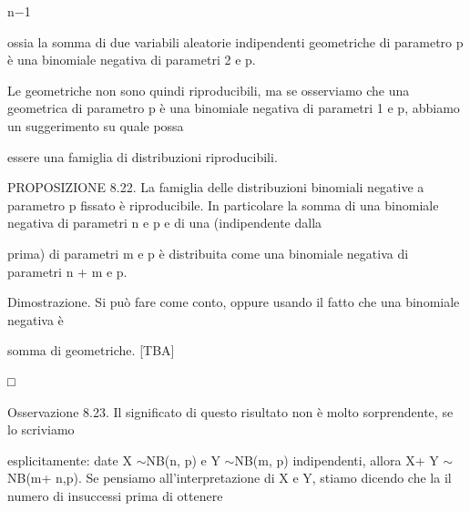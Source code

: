 \documentclass[a4paper,portrait,12pt]{article}
\begin{document}
\begin{flushleft}
n$-$1
\end{flushleft}


\begin{flushleft}
ossia la somma di due variabili aleatorie indipendenti geometriche di parametro p \`{e} una binomiale negativa di parametri 2 e p.
\end{flushleft}


\begin{flushleft}
Le geometriche non sono quindi riproducibili, ma se osserviamo che una geometrica di parametro p \`{e} una binomiale negativa di parametri 1 e p, abbiamo un suggerimento su quale possa
\end{flushleft}


\begin{flushleft}
essere una famiglia di distribuzioni riproducibili.
\end{flushleft}


\begin{flushleft}
PROPOSIZIONE 8.22. La famiglia delle distribuzioni binomiali negative a parametro p fissato \`{e} riproducibile. In particolare la somma di una binomiale negativa di parametri n e p e di una (indipendente dalla
\end{flushleft}


\begin{flushleft}
prima) di parametri m e p \`{e} distribuita come una binomiale negativa di parametri n + m e p.
\end{flushleft}


\begin{flushleft}
Dimostrazione. Si pu\`{o} fare come conto, oppure usando il fatto che una binomiale negativa \`{e}
\end{flushleft}


\begin{flushleft}
somma di geometriche. [TBA]
\end{flushleft}


□


\begin{flushleft}
Osservazione 8.23. Il significato di questo risultato non \`{e} molto sorprendente, se lo scriviamo
\end{flushleft}


\begin{flushleft}
esplicitamente: date X $\sim$NB(n, p) e Y $\sim$NB(m, p) indipendenti, allora X+ Y $\sim$ NB(m+ n,p). Se pensiamo all'interpretazione di X e Y, stiamo dicendo che la il numero di insuccessi prima di ottenere
\end{flushleft}
\end{document}
